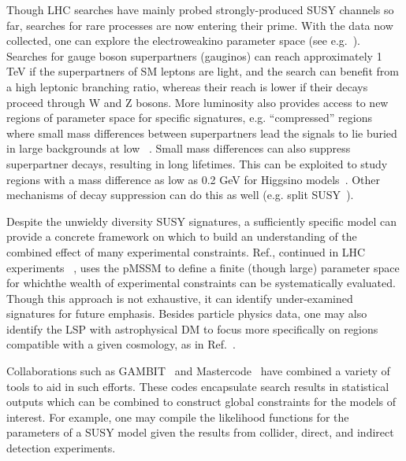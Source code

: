 Though LHC searches have mainly probed strongly-produced SUSY channels so far, searches for rare processes are now entering their prime.
With the data now collected, one can explore the electroweakino parameter space (see e.g.~\cite{Sirunyan:2018ubx,ATLAS:2017uun}). %
Searches for gauge boson superpartners (gauginos) can reach approximately 1 TeV if the superpartners of SM leptons are light, and the search can benefit from a high leptonic branching ratio, whereas their reach is lower if their decays proceed through W and Z bosons. %
More luminosity also provides access to new regions of parameter space for specific signatures, e.g. ``compressed'' regions where small mass differences between superpartners lead the signals to lie buried in large backgrounds at low \MET~\cite{Aaboud:2017leg,Sirunyan:2017zss}.
Small mass differences can also suppress superpartner decays, resulting in long lifetimes. This can be exploited to study regions with a mass difference as low as 0.2 GeV for Higgsino models~\cite{ATL-PHYS-PUB-2017-019}.
Other mechanisms of decay suppression can do this as well (e.g. split SUSY~\cite{Sirunyan:2018vjp}). 


Despite the unwieldy diversity SUSY signatures, a sufficiently specific model can provide a concrete framework on which to build an understanding of the combined effect of many experimental constraints. Ref.\cite{Conley:2010du}, continued in LHC experiments ~\cite{Aad:2015baa, Khachatryan:2016nvf}, uses the pMSSM to define a finite (though large) parameter space for whichthe  wealth of experimental constraints can be systematically evaluated.
Though this approach is not exhaustive, it can identify under-examined signatures for future emphasis.
Besides particle physics data, one may also identify the LSP with astrophysical DM to focus more specifically on regions compatible with a given cosmology, as in Ref.~\cite{Aaboud:2016wna}.

Collaborations such as GAMBIT~\cite{Athron:2017ard} and Mastercode~\cite{Bagnaschi:2017tru} have combined a variety of tools to aid in such efforts.
These codes encapsulate search results in statistical outputs which can be combined to construct global constraints for the models of interest. 
For example, one may compile the likelihood functions for the parameters of a SUSY model given the results from collider, direct, and indirect detection experiments.


